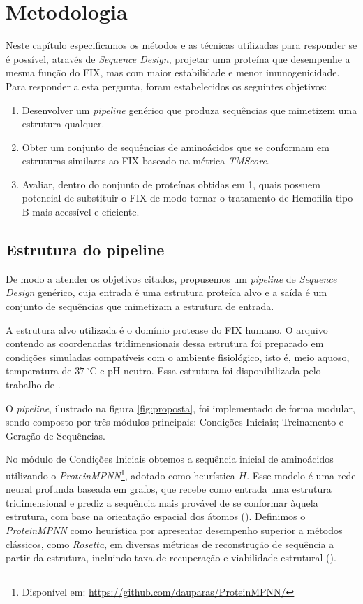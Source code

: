 \chapter{Metodologia}

Neste capítulo especificamos os métodos e as técnicas utilizadas para responder se é possível, 
através de \textit{Sequence Design}, 
projetar uma proteína que desempenhe a mesma função do FIX, mas com maior estabilidade e menor
imunogenicidade. Para responder a esta pergunta, foram estabelecidos os seguintes objetivos:

\begin{enumerate}
  \item Desenvolver um \textit{pipeline} genérico que produza sequências que mimetizem uma estrutura qualquer.
  \item Obter um conjunto de sequências de aminoácidos que se conformam em estruturas similares ao FIX baseado na métrica \textit{TMScore}.
  \item Avaliar, dentro do conjunto de proteínas obtidas em 1, quais possuem potencial de substituir o FIX de modo tornar o tratamento de Hemofilia tipo B mais acessível e eficiente.
\end{enumerate}

\section{Estrutura do pipeline}

De modo a atender os objetivos citados, propusemos um \textit{pipeline} de \textit{Sequence Design} genérico, 
cuja entrada é uma estrutura proteíca alvo e a saída 
é um conjunto de sequências que mimetizam a estrutura de entrada. 

A estrutura alvo utilizada é o domínio protease do FIX humano.
O arquivo contendo as coordenadas tridimensionais dessa estrutura foi preparado 
em condições simuladas compatíveis com o ambiente fisiológico, isto é, meio aquoso,
temperatura de $37\,^\circ\mathrm{C}$ e pH neutro. Essa estrutura foi disponibilizada pelo trabalho de \cite{CS}.

O \textit{pipeline}, ilustrado na figura \ref{fig:proposta}, foi implementado de forma modular, 
sendo composto por três módulos principais: Condições Iniciais; 
Treinamento e Geração de Sequências.

No módulo de Condições Iniciais obtemos a sequência inicial de aminoácidos
utilizando o \textit{ProteinMPNN}\footnote{Disponível em: \url{https://github.com/dauparas/ProteinMPNN/}},
adotado como heurística \( H \).
Esse modelo é uma rede neural profunda baseada em grafos, 
que recebe como entrada uma estrutura tridimensional 
e prediz a sequência mais provável de se conformar àquela estrutura, 
com base na orientação espacial dos átomos (\cite{ProteinMPNN}).
Definimos o \textit{ProteinMPNN} como heurística por apresentar 
desempenho superior a métodos clássicos, como \textit{Rosetta}, 
em diversas métricas de reconstrução de sequência a partir da estrutura, 
incluindo taxa de recuperação e viabilidade estrutural (\cite{ProteinMPNN}).

